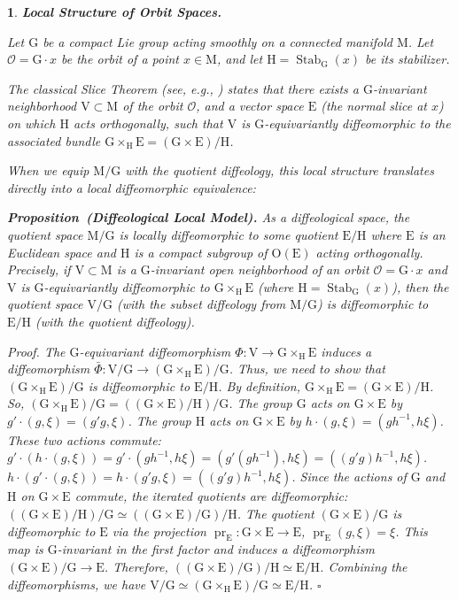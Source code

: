 \documentclass[10pt,reqno,letterpaper,twoside]{amsart}
\theoremstyle{article}
\newtheorem{article}{}
\def\artlabel[#1]{\textbf{#1.}}
\newenvironment{proposition}[1]%
{\noindent\textbf{Proposition#1.} \it}%
{}
\renewenvironment{proof}%
{\noindent\textit{Proof.}}%
{\nolinebreak\hfill $\square$}
\newcommand{\cO}{{\mathcal O}}
\def \E{\mathrm E}
\def \G{\mathrm G}
\def \H{\mathrm H}
\def \M{\mathrm M}
\def \O{\mathrm O}
\def \V{\mathrm V}
\DeclareMathOperator{\pr}{pr}
\DeclareMathOperator{\Stab}{Stab}
\def \H{\mathrm H} %
\def \O{\mathrm O}
\begin{document}
  \begin{article}
    \artlabel[Local Structure of Orbit Spaces]
    \label{Local_Structure_of_Orbit_Spaces}
    
    Let $\G$ be a compact Lie group acting smoothly on a connected manifold $\M$.
    Let $\cO = \G \cdot x$ be the orbit of a point $x \in \M$,
    and let $\H = \Stab_\G(x)$ be its stabilizer.
    
    The classical Slice Theorem (see, e.g., \cite{Pal60, Bre72}) states that there exists a $\G$-invariant neighborhood $\V\subset \M$ of the orbit $\cO$,
    and a vector space $\E$ (the normal slice at $x$) on which $\H$ acts orthogonally,
    such that $\V$ is $\G$-equivariantly diffeomorphic to the associated bundle $\G \times_\H \E = (\G \times \E)/\H$.
    
    When we equip $\M/\G$ with the quotient diffeology,
    this local structure translates directly into a local diffeomorphic equivalence:
    
    \begin{proposition}{~(Diffeological Local Model)}
      \label{loc}
      As a diffeological space,
      the quotient space $\M/\G$ is locally diffeomorphic to some quotient $\E/\H$ where $\E$ is an Euclidean space and $\H$ is a compact subgroup of $\O(\E)$ acting orthogonally.
      Precisely,
      if $\V \subset \M$ is a $\G$-invariant open neighborhood of an orbit $\cO = \G \cdot x$ and $\V$ is $\G$-equivariantly diffeomorphic to $\G \times_\H \E$ (where $\H = \Stab_\G(x)$),
      then the quotient space $\V/\G$ (with the subset diffeology from $\M/\G$) is diffeomorphic to $\E/\H$ (with the quotient diffeology).
    \end{proposition}
    
    \begin{proof}
      The $\G$-equivariant diffeomorphism $\Phi: \V \to \G \times_\H \E$ induces a diffeomorphism $\bar{\Phi}: \V/\G \to (\G \times_\H \E)/\G$.
      Thus,
      we need to show that $(\G \times_\H \E)/\G$ is diffeomorphic to $\E/\H$.
      By definition,
      $\G \times_\H \E = (\G \times \E)/\H$.
      So,
      $(\G \times_\H \E)/\G = ((\G \times \E)/\H)/\G$.
      The group $\G$ acts on $\G \times \E$ by $g' \cdot (g, \xi) = (g'g, \xi)$.
      The group $\H$ acts on $\G \times \E$ by $h \cdot (g, \xi) = (gh^{-1}, h\xi)$.
      These two actions commute:
      $g' \cdot (h \cdot (g, \xi)) = g' \cdot (gh^{-1}, h\xi) = (g'(gh^{-1}), h\xi) = ((g'g)h^{-1}, h\xi)$.
      $h \cdot (g' \cdot (g, \xi)) = h \cdot (g'g, \xi) = ((g'g)h^{-1}, h\xi)$.
      Since the actions of $\G$ and $\H$ on $\G \times \E$ commute,
      the iterated quotients are diffeomorphic: $((\G \times \E)/\H)/\G \simeq ((\G \times \E)/\G)/\H$.
      The quotient $(\G \times \E)/\G$ is diffeomorphic to $\E$ via the projection $\pr_\E: \G \times \E \to \E$, $\pr_\E(g, \xi) = \xi$.
      This map is $\G$-invariant in the first factor and induces a diffeomorphism $(\G \times \E)/\G \to \E$.
      Therefore,
      $((\G \times \E)/\G)/\H \simeq \E/\H$.
      Combining the diffeomorphisms, we have $\V/\G \simeq (\G \times_\H \E)/\G \simeq \E/\H$.
    \end{proof}
    
  \end{article}
  
\end{document}
